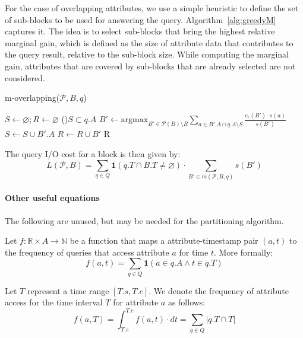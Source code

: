 \documentclass[twocolumn]{svjour3}          %
\let\emptyset\varnothing
\begin{document}
For the case of overlapping attributes, we use a simple heuristic to define the
set of sub-blocks to be used for answering the query.
Algorithm~\ref{alg:greedyM} captures it. The idea is to select sub-blocks that
bring the highest relative marginal gain, which is defined as the size of
attribute data that contributes to the query result, relative to the sub-block
size. While computing the marginal gain, attributes that are covered by
sub-blocks that are already selected are not considered.
%
\begin{algorithm}[h]
\scriptsize
\caption{m-overlapping($\mathcal{P}, B, q$)}
\label{alg:greedyM}
$S\leftarrow \emptyset; R\leftarrow \emptyset$ 
\While(){$S \subset q.A$}{
  $B' \leftarrow \mbox{argmax}_{B'\in\mathcal{P}(B)\setminus R} \sum_{a\in B'.A \cap q.A \setminus S} \frac{c_e(B') \cdot s(a)}{s(B')}$
  $S \leftarrow S \cup B'.A$
  $R\leftarrow R \cup B'$
}
\Return R 
\end{algorithm} 
%
The query I/O cost for a block is then given by:
\begin{equation}
L(\mathcal{P}, B) = \sum_{q\in Q} \mathbf{1}(q.T \cap B.T \neq \emptyset) \cdot \sum_{B'\in m(\mathcal{P}, B, q)} \!\!s(B')
\end{equation}


\paragraph{\textbf{Other useful equations}}

\noindent The following are unused, but may be needed for the partitioning
algorithm.

Let $f: \mathbb{R}\times A \rightarrow \mathbb{N}$ be a function that maps a
attribute-timestamp pair $(a, t)$ to the frequency of queries that access
attribute $a$ for time $t$. More formally:
\begin{equation}
f(a,t) = \sum_{q\in Q} \textbf{1}(a\in q.A \wedge t\in q.T)
\end{equation}
 
Let $T$ represent a time range $[T.s, T.e]$. We denote the frequency of
attribute access for the time interval $T$ for attribute $a$ as follows:
\begin{equation}
f(a, T) = \int_{T.s}^{T.e} f(a, t)\cdot dt =  \sum_{q\in Q} |q.T \cap T| 
\end{equation}
\end{document}
